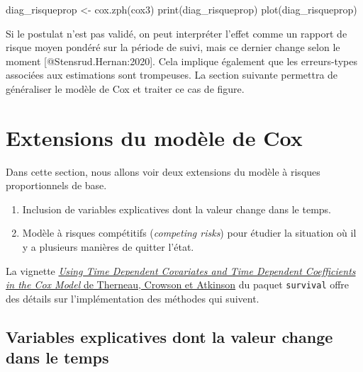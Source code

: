 \documentclass[
  11pt,
  letterpaper,
]{book}
\newenvironment{Shaded}{\begin{snugshade}}{\end{snugshade}}
\newcommand{\FunctionTok}[1]{\textcolor[rgb]{0.28,0.35,0.67}{#1}}
\newcommand{\NormalTok}[1]{\textcolor[rgb]{0.00,0.23,0.31}{#1}}
\newcommand{\OtherTok}[1]{\textcolor[rgb]{0.00,0.23,0.31}{#1}}
\providecommand{\tightlist}{%
  \setlength{\itemsep}{0pt}\setlength{\parskip}{0pt}}\usepackage{longtable,booktabs,array}
\theoremstyle{definition}
\theoremstyle{remark}
\begin{document}
\begin{Shaded}
\begin{Highlighting}[]
\NormalTok{diag\_risqueprop }\OtherTok{\textless{}{-}} \FunctionTok{cox.zph}\NormalTok{(cox3)}
\FunctionTok{print}\NormalTok{(diag\_risqueprop)}
\FunctionTok{plot}\NormalTok{(diag\_risqueprop)}
\end{Highlighting}
\end{Shaded}

Si le postulat n'est pas validé, on peut interpréter l'effet comme un
rapport de risque moyen pondéré sur la période de suivi, mais ce dernier
change selon le moment {[}@Stensrud.Hernan:2020{]}. Cela implique
également que les erreurs-types associées aux estimations sont
trompeuses. La section suivante permettra de généraliser le modèle de
Cox et traiter ce cas de figure.

\hypertarget{extensions-du-moduxe8le-de-cox}{%
\section{Extensions du modèle de
Cox}\label{extensions-du-moduxe8le-de-cox}}

Dans cette section, nous allons voir deux extensions du modèle à risques
proportionnels de base.

\begin{enumerate}
\def\labelenumi{\roman{enumi})}
\tightlist
\item
  Inclusion de variables explicatives dont la valeur change dans le
  temps.
\item
  Modèle à risques compétitifs (\emph{competing risks}) pour étudier la
  situation où il y a plusieurs manières de quitter l'état.
\end{enumerate}

La vignette
\href{https://cran.r-project.org/web/packages/survival/vignettes/timedep.pdf}{\emph{Using
Time Dependent Covariates and Time Dependent Coefficients in the Cox
Model} de Therneau, Crowson et Atkinson} du paquet \texttt{survival}
offre des détails sur l'implémentation des méthodes qui suivent.

\hypertarget{variables-explicatives-dont-la-valeur-change-dans-le-temps}{%
\subsection{Variables explicatives dont la valeur change dans le
temps}\label{variables-explicatives-dont-la-valeur-change-dans-le-temps}}
\end{document}
